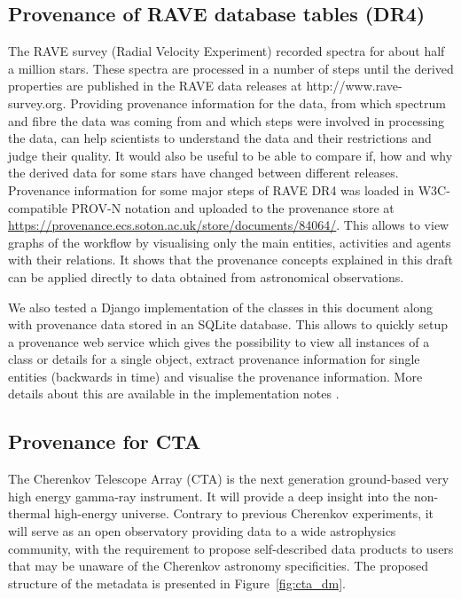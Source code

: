 \subsection{Provenance of RAVE database tables (DR4)}
The RAVE survey (Radial Velocity Experiment) recorded spectra for about half a 
million stars. These spectra are processed in a number of steps until the 
derived properties are published in the RAVE data releases at http://www.rave-survey.org.
Providing provenance information for the data, from which spectrum and fibre the
data was coming from and which steps were involved in processing the data, can help scientists
to understand the data and their restrictions and judge their quality.
It would also be useful to be able to compare if, how and why the derived data 
for some stars have changed between different releases.
Provenance information for some major steps of RAVE DR4 was loaded in 
W3C-compatible PROV-N notation and uploaded to the provenance store at 
\footnotesize{\url{https://provenance.ecs.soton.ac.uk/store/documents/84064/}}. This allows to view 
graphs of the workflow by visualising only the main entities, activities and agents 
with their relations. It shows that the provenance concepts explained in this draft 
can be applied directly to data obtained from astronomical observations.

We also tested a Django implementation of the classes in this document along with provenance data stored in an SQLite database. This allows to quickly setup a provenance web service
which gives the possibility to view all instances of a class or details for a single object, 
extract provenance information for single entities (backwards in time) and 
visualise the provenance information. 
More details about this are available in the implementation notes \citep{std:ProvenanceImplementationNote}.

\subsection{Provenance for CTA}

The Cherenkov Telescope Array (CTA) is the next generation ground-based very high energy gamma-ray instrument. It will provide a deep insight into the non-thermal high-energy universe. Contrary to previous Cherenkov experiments, it will serve as an open observatory providing data to a wide astrophysics community, with the requirement to propose self-described data products to users that may be unaware of the Cherenkov astronomy specificities. The proposed structure of the metadata is presented in Figure~\ref{fig:cta_dm}.

